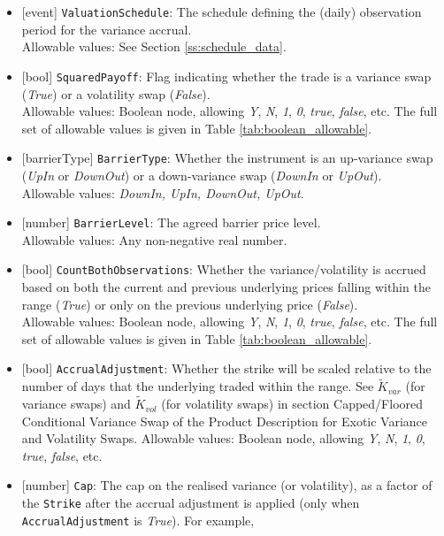 \begin{itemize}
  Allowable values: See ore/Docs/ScriptedTrade's Index Section for allowable values.
  \item{}[event] \lstinline!ValuationSchedule!: The schedule defining the (daily) observation period for the variance accrual. \\
  Allowable values: See Section \ref{ss:schedule_data}.
  \item{}[bool] \lstinline!SquaredPayoff!: Flag indicating whether the trade is a variance swap (\emph{True}) or a volatility
  swap (\emph{False}). \\
  Allowable values: Boolean node, allowing \emph{Y}, \emph{N}, \emph{1}, \emph{0}, \emph{true}, \emph{false}, etc.
  The full set of allowable values is given in Table \ref{tab:boolean_allowable}.
  \item{}[barrierType] \lstinline!BarrierType!: Whether the instrument is an up-variance swap (\emph{UpIn} or \emph{DownOut}) or
  a down-variance swap (\emph{DownIn} or \emph{UpOut}). \\
  Allowable values: \emph{DownIn, UpIn, DownOut, UpOut}.
  \item{}[number] \lstinline!BarrierLevel!: The agreed barrier price level. \\
  Allowable values: Any non-negative real number.
  \item{}[bool] \lstinline!CountBothObservations!: Whether the variance/volatility is accrued based on both the current and
  previous underlying prices falling within the range (\emph{True}) or only on the previous underlying price
  (\emph{False}). \\
  Allowable values: Boolean node, allowing \emph{Y}, \emph{N}, \emph{1}, \emph{0}, \emph{true}, \emph{false}, etc.
  The full set of allowable values is given in Table \ref{tab:boolean_allowable}.
  \item{}[bool] \lstinline!AccrualAdjustment!: Whether the strike will be scaled relative to the number of days that the
  underlying traded within the range. See $\widetilde{K}_{var}$ (for variance swaps) and $\widetilde{K}_{vol}$
  (for volatility swaps) in section Capped/Floored Conditional Variance Swap of the Product Description for
  Exotic Variance and Volatility Swaps.
  Allowable values: Boolean node, allowing \emph{Y}, \emph{N}, \emph{1}, \emph{0}, \emph{true}, \emph{false}, etc.
  \item{}[number] \lstinline!Cap!: The cap on the realised variance (or volatility), as a factor of the \lstinline!Strike! after
  the accrual adjustment is applied (only when \lstinline!AccrualAdjustment! is \emph{True}). For example,

\end{itemize}
